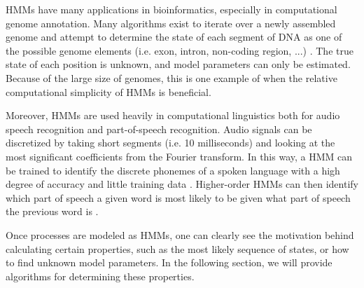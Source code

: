 HMMs have many applications in bioinformatics, especially in computational genome annotation. Many algorithms exist to iterate over a newly assembled genome and attempt to determine the state of each segment of DNA as one of the possible genome elements (i.e. exon, intron, non-coding region, ...) \cite{Stanke03}. The true state of each position is unknown, and model parameters can only be estimated. Because of the large size of genomes, this is one example of when the relative computational simplicity of HMMs is beneficial.

Moreover, HMMs are used heavily in computational linguistics both for
audio speech recognition and part-of-speech recognition. Audio signals
can be discretized by taking short segments (i.e. 10 milliseconds) and
looking at the most significant coefficients from the Fourier transform.
In this way, a HMM can be trained to identify the discrete phonemes of a
spoken language with a high degree of accuracy and little training data
\cite{Gales07}. Higher-order HMMs can then identify which part of speech
a given word is most likely to be given what part of speech the previous
word is \cite{Hull92}.

Once processes are modeled as HMMs, one can clearly see the motivation
behind calculating certain properties, such as the most likely sequence
of states, or how to find unknown model parameters. In the following
section, we will provide algorithms for determining these properties.
